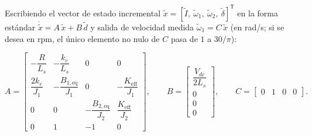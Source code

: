 \documentclass[11pt,a4paper,oneside]{book}
\begin{document}
Escribiendo el vector de estado incremental
$\tilde x = [\tilde I,\ \tilde\omega_1,\ \tilde\omega_2,\ \tilde\delta]^{\mathsf{T}}$
en la forma estándar $\dot{\tilde x} = A\,\tilde x + B\,\tilde d$ y salida de
velocidad medida $\tilde\omega_1 = C\,\tilde x$ (en \si{rad/s}; si se desea en
\si{rpm}, el único elemento no nulo de $C$ pasa de $1$ a $30/\pi$):
\begin{ecuacionclave}
\begin{equation}
  A = \begin{bmatrix}
    -\dfrac{R}{L_s} & -\dfrac{k_e}{L_s} & 0 & 0 \\[8pt]
    \dfrac{2k_e}{J_1} & -\dfrac{B_{1,\text{eq}}}{J_1} & 0 & -\dfrac{K_{\text{eff}}}{J_1} \\[8pt]
    0 & 0 & -\dfrac{B_{2,\text{eq}}}{J_2} & \dfrac{K_{\text{eff}}}{J_2} \\[8pt]
    0 & 1 & -1 & 0
  \end{bmatrix},
  \qquad
  B = \begin{bmatrix}
    \dfrac{V_{dc}}{2L_s} \\[8pt] 0 \\[6pt] 0 \\[6pt] 0
  \end{bmatrix},
  \qquad
  C = \begin{bmatrix} 0 & 1 & 0 & 0 \end{bmatrix}.
  \label{eq:ss_cap7}
\end{equation}
\end{ecuacionclave}
\end{document}

